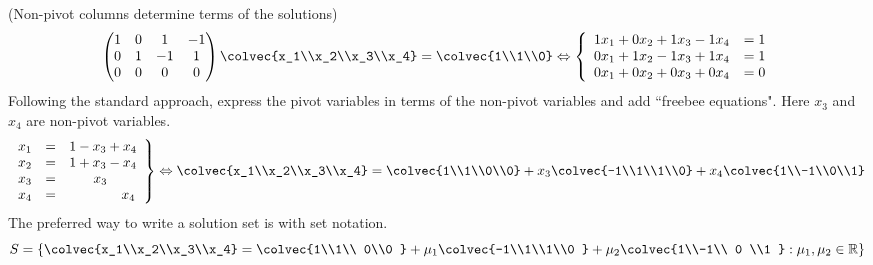 \begin{example} (Non-pivot columns determine terms of the solutions)
\[\begin{pmatrix}
1 &  0 & 1 & -1 \\ 
 0 & 1 & -1& 1  \\
 0 &0   & 0  & 0 \\
\end{pmatrix}
\colvec{x_1\\x_2\\x_3\\x_4} 
=
\colvec{1\\1\\0} 
\Leftrightarrow
\left\{
\begin{array}{lcr}
	1x_1 +0x_2+ 1x_3 - 1x_4 & = 1 \\
	0x_1 +1x_2 - 1x_3 + 1x_4 & = 1 \\
	0x_1 +0x_2 + 0x_3 + 0x_4 & = 0 
\end{array}
     \right.
\]
Following the standard approach, express the pivot variables in terms of the non-pivot variables and add ``freebee equations". Here $x_3$ and $x_4$ are non-pivot variables.  
\[
\left.
\begin{array}{rcl}
	x_1 & = &1 -x_3+x_4 \\
	x_2 & = &1 +x_3-x_4 \\
	x_3 & = &\phantom{1+~\,}x_3\\
	x_4 & =&\phantom{1+x_3+~}x_4         
\end{array}
     \right\}
     \Leftrightarrow
\colvec{x_1\\x_2\\x_3\\x_4} 
= \colvec{1\\1\\0\\0} + x_3\colvec{-1\\1\\1\\0} + x_4\colvec{1\\-1\\0\\1}
\]
The preferred way to write a solution set is with set notation.  \[S = \left\{\colvec{x_1\\x_2\\x_3\\x_4} = \colvec{1\\1\\ 0\\0 } + \mu_1 \colvec{-1\\1\\1\\0 }  + \mu_2  \colvec{1\\-1\\ 0 \\1 } : \mu_1,\mu_2\in  {\mathbb R} \right\} \]

\end{example}
